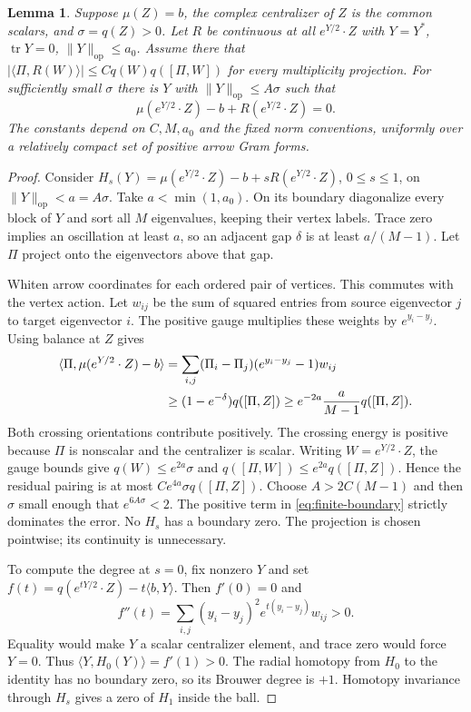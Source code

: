 \documentclass[11pt]{amsart}
\newtheorem{lemma}[theorem]{Lemma}
\theoremstyle{definition}
\theoremstyle{remark}
\newcommand{\tr}{\operatorname{tr}}
\newcommand{\op}{\operatorname{op}}
\begin{document}
\begin{lemma}\label{lem:finite-correction}
Suppose $\mu(Z)=b$, the complex centralizer of $Z$ is the common
scalars, and $\sigma=q(Z)>0$. Let $R$ be continuous at all
$e^{Y/2}\cdot Z$ with $Y=Y^*$, $\tr Y=0$, $\|Y\|_{\op}\le a_0$.
Assume there that
$|\langle\Pi,R(W)\rangle|\le Cq(W)q([\Pi,W])$ for every
multiplicity projection. For sufficiently small $\sigma$ there is
$Y$ with $\|Y\|_{\op}\le A\sigma$ such that
\[
 \mu(e^{Y/2}\cdot Z)-b+R(e^{Y/2}\cdot Z)=0.
\]
The constants depend on $C,M,a_0$ and the fixed norm conventions,
uniformly over a relatively compact set of positive arrow Gram forms.
\end{lemma}
\begin{proof}
Consider
$H_s(Y)=\mu(e^{Y/2}\cdot Z)-b+sR(e^{Y/2}\cdot Z)$,
$0\le s\le1$, on $\|Y\|_{\op}<a=A\sigma$.
Take $a<\min(1,a_0)$. On its boundary diagonalize every block of
$Y$ and sort all $M$ eigenvalues, keeping their vertex labels.
Trace zero implies an oscillation at least $a$, so an adjacent gap
$\delta$ is at least $a/(M-1)$. Let $\Pi$ project onto the
eigenvectors above that gap.

Whiten arrow coordinates for each ordered pair of vertices. This
commutes with the vertex action. Let $w_{ij}$ be the sum of squared
entries from source eigenvector $j$ to target eigenvector $i$.
The positive gauge multiplies these weights by $e^{y_i-y_j}$.
Using balance at $Z$ gives
\begin{align}
 \langle\Pi,\mu(e^{Y/2}\cdot Z)-b\rangle
 &=\sum_{i,j}(\Pi_i-\Pi_j)(e^{y_i-y_j}-1)w_{ij}\notag\\
 &\ge(1-e^{-\delta})q([\Pi,Z])
 \ge e^{-2a}\frac{a}{M-1}q([\Pi,Z]).\label{eq:finite-boundary}
\end{align}
Both crossing orientations contribute positively. The crossing energy
is positive because $\Pi$ is nonscalar and the centralizer is scalar.
Writing $W=e^{Y/2}\cdot Z$, the gauge bounds give
$q(W)\le e^{2a}\sigma$ and
$q([\Pi,W])\le e^{2a}q([\Pi,Z])$. Hence the residual pairing is
at most $Ce^{4a}\sigma q([\Pi,Z])$.
Choose $A>2C(M-1)$ and then $\sigma$ small enough that
$e^{6A\sigma}<2$. The positive term in \eqref{eq:finite-boundary}
strictly dominates the error. No $H_s$ has a boundary zero.
The projection is chosen pointwise; its continuity is unnecessary.

To compute the degree at $s=0$, fix nonzero $Y$ and set
$f(t)=q(e^{tY/2}\cdot Z)-t\langle b,Y\rangle$. Then $f'(0)=0$ and
\[
 f''(t)=\sum_{i,j}(y_i-y_j)^2e^{t(y_i-y_j)}w_{ij}>0.
\]
Equality would make $Y$ a scalar centralizer element, and trace zero
would force $Y=0$. Thus $\langle Y,H_0(Y)\rangle=f'(1)>0$.
The radial homotopy from $H_0$ to the identity has no boundary zero,
so its Brouwer degree is $+1$. Homotopy invariance through $H_s$
gives a zero of $H_1$ inside the ball.
\end{proof}
\end{document}
